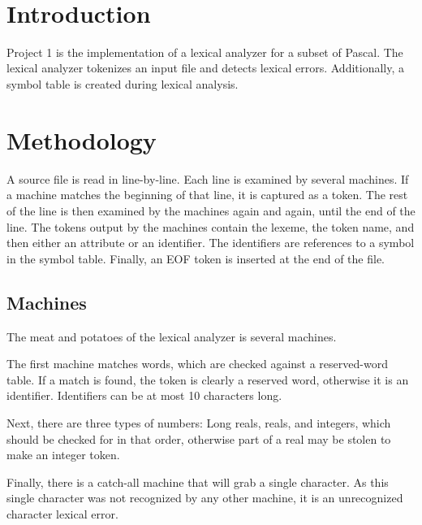 \documentclass[paper=letter, fontsize=11pt, oneside, titlepage]{scrartcl}
\title{
\vspace{1.8 in} \normalfont \normalsize 
\textsc{\pschool} \\ [25pt] %
\horrule{0.5pt} \\[0.4cm] %
\huge \ptitle \\ %
\horrule{0.5pt} \\[0.5cm] %
}
\author{\pauthor} %
\date{
    \normalsize
    \pteacher \endgraf
    \pclass \endgraf
    \pdate
} %
\begin{document}

\maketitle

\section{Introduction}\label{intro}

Project 1 is the implementation of a lexical analyzer for a subset of Pascal.  The lexical analyzer tokenizes an input file and detects lexical errors.  Additionally, a symbol table is created during lexical analysis.

\section{Methodology}\label{meth}

A source file is read in line-by-line. Each line is examined by several machines. If a machine matches the beginning of that line, it is captured as a token. The rest of the line is then examined by the machines again and again, until the end of the line. The tokens output by the machines contain the lexeme, the token name, and then either an attribute or an identifier. The identifiers are references to a symbol in the symbol table. Finally, an EOF token is inserted at the end of the file.

\subsection{Machines}\label{machines}

The meat and potatoes of the lexical analyzer is several machines.

The first machine matches words, which are checked against a reserved-word table. If a match is found, the token is clearly a reserved word, otherwise it is an identifier.  Identifiers can be at most 10 characters long.

Next, there are three types of numbers: Long reals, reals, and integers, which should be checked for in that order, otherwise part of a real may be stolen to make an integer token.

Finally, there is a catch-all machine that will grab a single character. As this single character was not recognized by any other machine, it is an unrecognized character lexical error.
\end{document}
